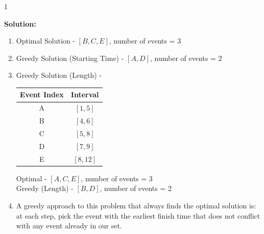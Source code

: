 \documentclass[9pt]{article}
\def\solutions{1}
\begin{document}
\if\solutions1
\vspace{2mm}

\textbf{Solution:} \\

\begin{enumerate}
    \item Optimal Solution - $[B, C, E]$, number of events = $3$
    \item Greedy Solution (Starting Time) - $[A,D]$, number of events = $2$
    \item Greedy Solution (Length) -
    
    \begin{center}
    \begin{tabular}{c|c}
    Event Index & Interval \\ \hline
    A & $[1,5]$ \\ 
    B & $[4,6]$ \\
    C & $[5,8]$ \\
    D & $[7,9]$ \\
    E & $[8,12]$
    \end{tabular}
    \end{center}
    Optimal - $[A,C,E]$, number of events = 3\\
    Greedy (Length) - $[B,D]$, number of events = 2

    \item A greedy approach to this problem that always finds the optimal solution is: at each step, pick the event with the earliest finish time that does not conflict with any event already in our set.
\end{enumerate}


\fi
\newpage



\vspace{5mm}
\end{document}
